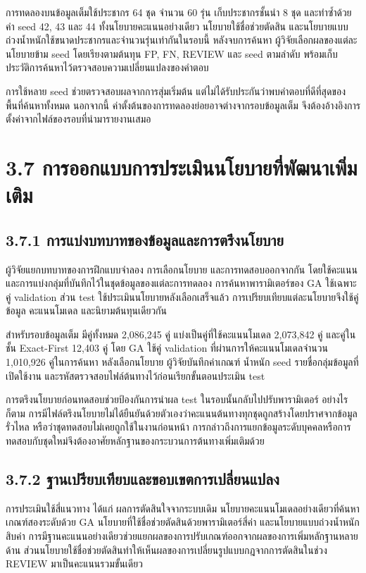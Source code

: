 \documentclass[12pt,a4paper]{report}
\begin{document}
การทดลองบนข้อมูลเต็มใช้ประชากร 64 ชุด จำนวน 60 รุ่น เก็บประชากรชั้นนำ 8 ชุด และทำซ้ำด้วยค่า seed 42, 43 และ 44 ทั้งนโยบายคะแนนอย่างเดียว นโยบายใช้ชื่อช่วยตัดสิน และนโยบายแบบถ่วงน้ำหนักใช้ขนาดประชากรและจำนวนรุ่นเท่ากันในรอบนี้ หลังจบการค้นหา ผู้วิจัยเลือกผลของแต่ละนโยบายข้าม seed โดยเรียงตามต้นทุน FP, FN, REVIEW และ seed ตามลำดับ พร้อมเก็บประวัติการค้นหาไว้ตรวจสอบความเปลี่ยนแปลงของคำตอบ

การใช้หลาย seed ช่วยตรวจสอบผลจากการสุ่มเริ่มต้น แต่ไม่ได้รับประกันว่าพบคำตอบที่ดีที่สุดของพื้นที่ค้นหาทั้งหมด นอกจากนี้ ค่าตั้งต้นของการทดลองย่อยอาจต่างจากรอบข้อมูลเต็ม จึงต้องอ้างอิงการตั้งค่าจากไฟล์ของรอบที่นำมารายงานเสมอ

\section*{3.7 การออกแบบการประเมินนโยบายที่พัฒนาเพิ่มเติม}
\subsection*{3.7.1 การแบ่งบทบาทของข้อมูลและการตรึงนโยบาย}
ผู้วิจัยแยกบทบาทของการฝึกแบบจำลอง การเลือกนโยบาย และการทดสอบออกจากกัน โดยใช้คะแนนและการแบ่งกลุ่มที่บันทึกไว้ในชุดข้อมูลของแต่ละการทดลอง การค้นหาพารามิเตอร์ของ GA ใช้เฉพาะคู่ validation ส่วน test ใช้ประเมินนโยบายหลังเลือกเสร็จแล้ว การเปรียบเทียบแต่ละนโยบายจึงใช้คู่ข้อมูล คะแนนโมเดล และนิยามต้นทุนเดียวกัน

สำหรับรอบข้อมูลเต็ม มีคู่ทั้งหมด 2,086,245 คู่ แบ่งเป็นคู่ที่ใช้คะแนนโมเดล 2,073,842 คู่ และคู่ในชั้น Exact-First 12,403 คู่ โดย GA ใช้คู่ validation ที่ผ่านการให้คะแนนโมเดลจำนวน 1,010,926 คู่ในการค้นหา หลังเลือกนโยบาย ผู้วิจัยบันทึกค่าเกณฑ์ น้ำหนัก seed รายชื่อกลุ่มข้อมูลที่เปิดใช้งาน และรหัสตรวจสอบไฟล์ต้นทางไว้ก่อนเรียกขั้นตอนประเมิน test

การตรึงนโยบายก่อนทดสอบช่วยป้องกันการนำผล test ในรอบนั้นกลับไปปรับพารามิเตอร์ อย่างไรก็ตาม การมีไฟล์ตรึงนโยบายไม่ได้ยืนยันด้วยตัวเองว่าคะแนนต้นทางทุกชุดถูกสร้างโดยปราศจากข้อมูลรั่วไหล หรือว่าชุดทดสอบไม่เคยถูกใช้ในงานก่อนหน้า การกล่าวถึงการแยกข้อมูลระดับบุคคลหรือการทดสอบกับชุดใหม่จึงต้องอาศัยหลักฐานของกระบวนการต้นทางเพิ่มเติมด้วย

\subsection*{3.7.2 ฐานเปรียบเทียบและขอบเขตการเปลี่ยนแปลง}
การประเมินใช้สี่แนวทาง ได้แก่ ผลการตัดสินใจจากระบบเดิม นโยบายคะแนนโมเดลอย่างเดียวที่ค้นหาเกณฑ์สองระดับด้วย GA นโยบายที่ใช้ชื่อช่วยตัดสินด้วยพารามิเตอร์สี่ค่า และนโยบายแบบถ่วงน้ำหนักสิบค่า การมีฐานคะแนนอย่างเดียวช่วยแยกผลของการปรับเกณฑ์ออกจากผลของการเพิ่มหลักฐานหลายด้าน ส่วนนโยบายใช้ชื่อช่วยตัดสินทำให้เห็นผลของการเปลี่ยนรูปแบบกฎจากการตัดสินในช่วง REVIEW มาเป็นคะแนนรวมขั้นเดียว
\end{document}
